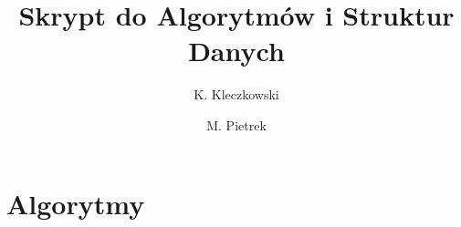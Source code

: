 \documentclass{book}
\title{Skrypt do Algorytmów i Struktur Danych}
\author{
    K. Kleczkowski
    \and M. Pietrek   
}
\begin{document}
    \maketitle
    \tableofcontents

    \part{Algorytmy}

    

    \printbibliography
\end{document}
